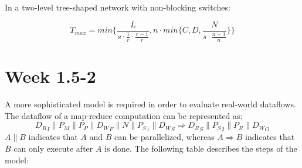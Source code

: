 \documentclass{acm_proc_article-sp}
\begin{document}
In a two-level tree-shaped network with non-blocking switches:

\begin{equation}
T_{max} = min\{\frac{ L }{ s \cdot \frac{1}{r} \cdot \frac{r-1}{r} }, n \cdot min\{C, D, \frac{ N }{ s \cdot \frac{n-1}{n} }\}\}
\label{eqn:tmaxtree}
\end{equation}

\pagebreak 

\section{Week 1.5-2}
A more sophisticated model is required in order to evaluate real-world dataflows. The dataflow of a map-reduce computation can be represented as:
\begin{equation}
{D_{R}}_I \| P_{M} \| P_{P} \|
{D_{W}}_F \| N \| {P_{S}}_1 \|
{D_{W}}_S \Rightarrow {D_{R}}_S \| {P_{S}}_2 \|
P_{R} \| {D_{W}}_O
\label{eqn:dataflow}
\end{equation}
$A \| B$ indicates that $A$ and $B$ can be parallelized, whereas $A \Rightarrow B$ indicates that $B$ can only execute after $A$ is done. The following table describes the steps of the model:
\end{document}
